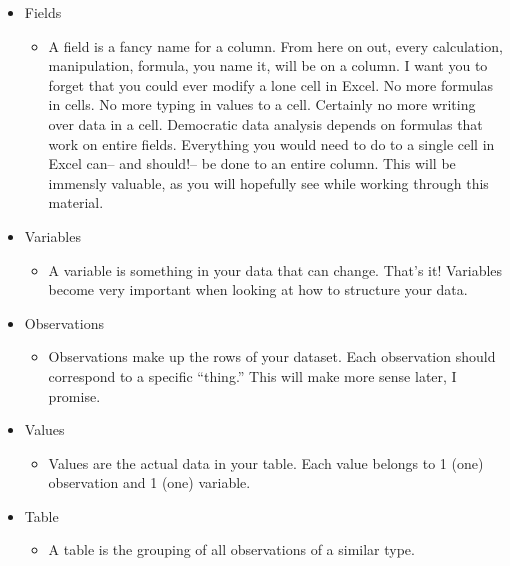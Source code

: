 \documentclass[]{book}
\providecommand{\tightlist}{%
  \setlength{\itemsep}{0pt}\setlength{\parskip}{0pt}}
\begin{document}
\begin{itemize}
\tightlist
\item
  Fields

  \begin{itemize}
  \tightlist
  \item
    A field is a fancy name for a column. From here on out, every
    calculation, manipulation, formula, you name it, will be on a
    column. I want you to forget that you could ever modify a lone cell
    in Excel. No more formulas in cells. No more typing in values to a
    cell. Certainly no more writing over data in a cell. Democratic data
    analysis depends on formulas that work on entire fields. Everything
    you would need to do to a single cell in Excel can-- and should!--
    be done to an entire column. This will be immensly valuable, as you
    will hopefully see while working through this material.
  \end{itemize}
\item
  Variables

  \begin{itemize}
  \tightlist
  \item
    A variable is something in your data that can change. That's it!
    Variables become very important when looking at how to structure
    your data.
  \end{itemize}
\item
  Observations

  \begin{itemize}
  \tightlist
  \item
    Observations make up the rows of your dataset. Each observation
    should correspond to a specific ``thing.'' This will make more sense
    later, I promise.
  \end{itemize}
\item
  Values

  \begin{itemize}
  \tightlist
  \item
    Values are the actual data in your table. Each value belongs to 1
    (one) observation and 1 (one) variable.
  \end{itemize}
\item
  Table

  \begin{itemize}
  \tightlist
  \item
    A table is the grouping of all observations of a similar type.
  \end{itemize}
\end{itemize}
\end{document}
